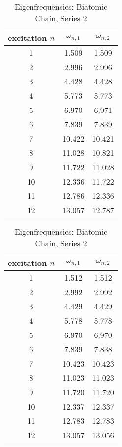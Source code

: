 \begin{table}
	\begin{minipage}{0.5\textwidth}
	\centering
	\caption{Eigenfrequencies: Biatomic Chain, Series 1}
	\label{tab:eigenfreqs_a1_1b}
	\begin{tabular}{S|SS}
		\toprule
		{excitation $n$}	&	{$\omega_{n,\text{1}}$}	&	{$\omega_{n,\text{2}}$} \\
			&	1.509	&	1.509	\\
		2	&	2.996	&	2.996	\\
		3	&	4.428	&	4.428	\\
		4	&	5.773	&	5.773	\\
		5	&	6.970	&	6.971	\\
		6	&	7.839	&	7.839	\\
		7	&	10.422	&	10.421	\\
		8	&	11.028	&	10.821	\\
		9	&	11.722	&	11.028	\\
		10	&	12.336	&	11.722	\\
		11	&	12.786	&	12.336	\\
		12	&	13.057	&	12.787	\\
		\bottomrule
	\end{tabular}
	\end{minipage}
	\hfillx
	\begin{minipage}{0.5\textwidth}
	\centering
	\caption{Eigenfrequencies: Biatomic Chain, Series 2}
	\label{tab:eigenfreqs_a1_2b}
	\begin{tabular}{S|SS}
		\toprule
		{excitation $n$}	&	{$\omega_{n,\text{1}}$}	&	{$\omega_{n,\text{2}}$} \\
			&	1.512	&	1.512	\\
		2	&	2.992	&	2.992	\\
		3	&	4.429	&	4.429	\\
		4	&	5.778	&	5.778	\\
		5	&	6.970	&	6.970	\\
		6	&	7.839	&	7.838	\\
		7	&	10.423	&	10.423	\\
		8	&	11.023	&	11.023	\\
		9	&	11.720	&	11.720	\\
		10	&	12.337	&	12.337	\\
		11	&	12.783	&	12.783	\\
		12	&	13.057	&	13.056	\\
		\bottomrule
	\end{tabular}
	\end{minipage}
\end{table}
